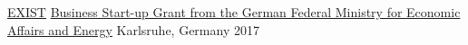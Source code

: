 


\begin{cvhonors}

  \cvhonor
    {\href{https://www.ksri.kit.edu/news_2520.php}{EXIST}} %
    {\href{https://www.ksri.kit.edu/news_2520.php}{Business Start-up Grant from the German Federal Ministry for Economic Affairs and Energy}} %
    {Karlsruhe, Germany} %
    {2017} %

\end{cvhonors}
